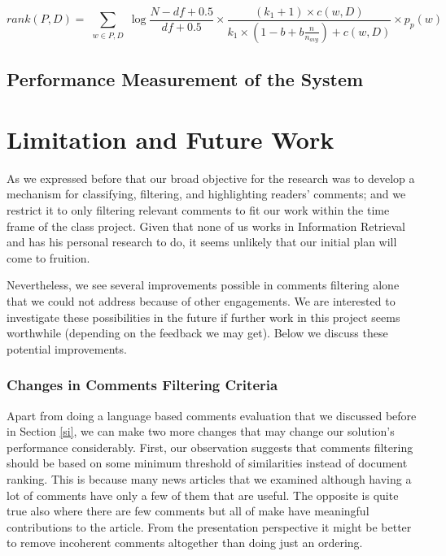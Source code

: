 \documentclass[article]{IEEEtran}
\begin{document}
\begin{widetext}
\begin{equation*}
\label{modBM25}
rank(P,D) = \sum_{\substack{w \in P,D}}\log{\frac{N - df + 0.5}{df + 0.5}} \times 
{\frac{(k_1 + 1) \times c(w, D)}{k_1 \times (1 - b + b \frac{n}{n_{avg}}) + c(w,D)}} \times p_p(w)
\end{equation*}
\end{widetext}


   

\subsection{Performance Measurement of the System}




\section{Limitation and Future Work}
\label{fw}
As we expressed before that our broad objective for the research was to develop a mechanism for classifying, filtering, and highlighting readers' comments; and we restrict it to only filtering relevant comments to fit our work within the time frame of the class project. Given that none of us works in Information Retrieval and has his personal research to do, it seems unlikely that our initial plan will come to fruition.

Nevertheless, we see several improvements possible in comments filtering alone that we could not address because of other engagements. We are interested to investigate these possibilities in the future if further work in this project seems worthwhile (depending on the feedback we may get). Below we discuss these potential improvements.       

\subsubsection{Changes in Comments Filtering Criteria}
Apart from doing a language based comments evaluation that we discussed before in Section \ref{si}, we can make two more changes that may change our solution's performance considerably. First, our observation suggests that comments filtering should be based on some minimum threshold of similarities instead of document ranking. This is because many news articles that we examined although having a lot of comments have only a few of them that are useful. The opposite is quite true also where there are few comments but all of make have meaningful contributions to the article. From the presentation perspective it might be better to remove incoherent comments altogether than doing just an ordering.
\end{document}
